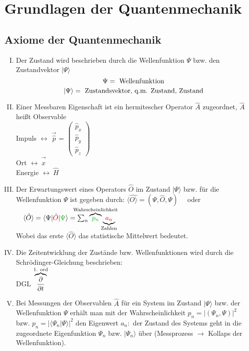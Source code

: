 
\chapter{Grundlagen der Quantenmechanik}


\section{Axiome der Quantenmechanik}

\begin{enumerate}[I)]
	\item Der Zustand wird beschrieben durch die Wellenfunktion $ \Psi $ bzw. den Zustandvektor $ |\Psi \rangle $\\
	$$ \Psi = \textrm{ Wellenfunktion}$$
	$$ \vert\Psi\rangle = \textrm{ Zustandsvektor, q.m. Zustand, Zustand}$$
	\item Einer Messbaren Eigenschaft ist ein hermitescher Operator $ \hat{A} $ zugeordnet, $ \hat{A} $ heißt Observable\\
	Impuls $\leftrightarrow$ $\vec{\hat p}$ = $\begin{pmatrix} \hat p_x \\ \hat p_y \\ \hat p_z \end{pmatrix}$\\
	Ort $\leftrightarrow\ \vec{\hat x}$\\
	Energie $\leftrightarrow\ \hat H$
	\item Der Erwartungswert eines Operators $ \hat{O} $ im Zustand $ |\Psi\rangle $ bzw. für die Wellenfunktion $ \Psi $ ist gegeben durch:
	 $ \langle \hat{ O \rangle} = (\Psi, \hat{O}, \Psi) \quad $ oder $ \quad \langle \hat O \rangle = \langle \Psi \vert \color{black!20!red}\hat O \color{black}\vert \color{black!30!green} \Psi \color{black}\rangle = \sum_n \overbrace{\color{black!30!green}p_n}^{\mathclap{\tx{Wahrscheinlichkeit}}} \underbrace{\color{black!20!red}a_n}_{\mathclap{\tx{Zahlen}}}$\\
	Wobei das erste $\langle \hat O \rangle$ das statistische Mittelwert bedeutet. \\
	\item Die Zeitentwicklung der Zustände bzw. Wellenfunktionen wird durch die Schrödinger-Gleichung beschrieben:\\
	DGL $\overbrace{\frac{\partial }{\partial t}}^{\textrm{1. ord}}$
	\item Bei Messungen der Observablen $ \hat{A} $ für ein System im Zustand $ |\Psi \rangle $ bzw. der Wellenfunktion $ \Psi $ erhält man mit der Wahrscheinlichkeit $ p_n = |(\Psi_n, \Psi)|^2 $ bzw. $ p_n = |\langle \Psi_n | \Psi \rangle |^2 $ den Eigenwert $ a_n : $ der Zustand des Systems geht in die zugeordnete Eigenfunktion $ \Psi_n $ bzw. $ |\Psi_n\rangle $ über (Messprozess $ \rightarrow $ Kollaps der Wellenfunktion). \label{Axiom5}
\end{enumerate}
